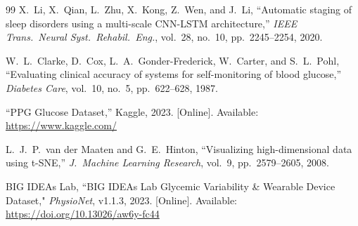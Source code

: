 \documentclass[conference]{IEEEtran}
\begin{document}
\begin{thebibliography}{99}
X.~Li, X.~Qian, L.~Zhu, X.~Kong, Z.~Wen, and J.~Li,
``Automatic staging of sleep disorders using a multi-scale CNN-LSTM
architecture,''
\textit{IEEE Trans.\ Neural Syst.\ Rehabil.\ Eng.}, vol.~28,
no.~10, pp.~2245--2254, 2020.

W.~L.~Clarke, D.~Cox, L.~A.~Gonder-Frederick, W.~Carter,
and S.~L.~Pohl,
``Evaluating clinical accuracy of systems for self-monitoring of blood glucose,''
\textit{Diabetes Care}, vol.~10, no.~5, pp.~622--628, 1987.

``PPG Glucose Dataset,''
Kaggle, 2023.
[Online]. Available: \url{https://www.kaggle.com/}

L.~J.~P.~van der Maaten and G.~E.~Hinton,
``Visualizing high-dimensional data using t-SNE,''
\textit{J.\ Machine Learning Research}, vol.~9, pp.~2579--2605, 2008.

BIG IDEAs Lab,
``BIG IDEAs Lab Glycemic Variability \& Wearable Device Dataset,"
\textit{PhysioNet}, v1.1.3, 2023.
[Online]. Available: \url{https://doi.org/10.13026/aw6y-fc44}

\end{thebibliography}
\end{document}
